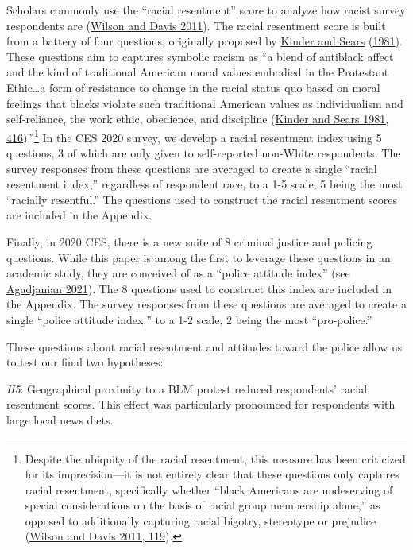 \documentclass[
  12pt,
]{article}
\begin{document}
Scholars commonly use the ``racial resentment'' score to analyze how racist survey respondents are (\protect\hyperlink{ref-Wilson2011}{Wilson and Davis 2011}). The racial resentment score is built from a battery of four questions, originally proposed by \protect\hyperlink{ref-Kinder1981}{Kinder and Sears} (\protect\hyperlink{ref-Kinder1981}{1981}). These questions aim to captures symbolic racism as ``a blend of antiblack affect and the kind of traditional American moral values embodied in the Protestant Ethic\ldots a form of resistance to change in the racial status quo based on moral feelings that blacks violate such traditional American values as individualism and self-reliance, the work ethic, obedience, and discipline (\protect\hyperlink{ref-Kinder1981}{Kinder and Sears 1981, 416}).''\footnote{Despite the ubiquity of the racial resentment, this measure has been criticized for its imprecision---it is not entirely clear that these questions only captures racial resentment, specifically whether ``black Americans are undeserving of special considerations on the basis of racial group membership alone,'' as opposed to additionally capturing racial bigotry, stereotype or prejudice (\protect\hyperlink{ref-Wilson2011}{Wilson and Davis 2011, 119}).} In the CES 2020 survey, we develop a racial resentment index using 5 questions, 3 of which are only given to self-reported non-White respondents. The survey responses from these questions are averaged to create a single ``racial resentment index,'' regardless of respondent race, to a 1-5 scale, 5 being the most ``racially resentful.'' The questions used to construct the racial resentment scores are included in the Appendix.

Finally, in 2020 CES, there is a new suite of 8 criminal justice and policing questions. While this paper is among the first to leverage these questions in an academic study, they are conceived of as a ``police attitude index'' (see \protect\hyperlink{ref-Agadjanian2021}{Agadjanian 2021}). The 8 questions used to construct this index are included in the Appendix. The survey responses from these questions are averaged to create a single ``police attitude index,'' to a 1-2 scale, 2 being the most ``pro-police.''

These questions about racial resentment and attitudes toward the police allow us to test our final two hypotheses:

\emph{H5}: Geographical proximity to a BLM protest reduced respondents' racial resentment scores. This effect was particularly pronounced for respondents with large local news diets.
\end{document}
